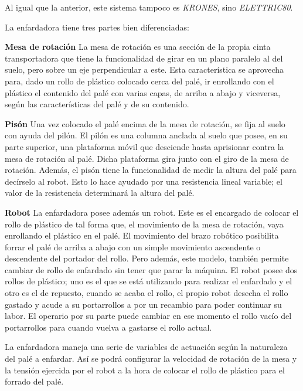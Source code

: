 \documentclass[11pt,a4paper,spanish,twoside]{report}
\begin{document}
Al igual que la anterior, este sistema tampoco es \emph{KRONES}, sino 
\emph{ELETTRIC80}.

La enfardadora tiene tres partes bien diferenciadas:
\begin{description}
\item \textbf{Mesa de rotación}
La mesa de rotación es una sección de la propia cinta transportadora que tiene 
la funcionalidad de girar en un plano paralelo al del suelo, pero sobre un eje 
perpendicular a este. Esta característica se aprovecha para, dado un rollo de 
plástico colocado cerca del palé, ir enrollando con el plástico el contenido 
del palé con varias capas, de arriba a abajo y viceversa, según las 
características del palé y de su contenido.
\item \textbf{Pisón}
Una vez colocado el palé encima de la mesa de rotación, se fija al suelo con 
ayuda del pilón. El pilón es una columna anclada al suelo que posee, en su 
parte superior, una plataforma móvil que desciende hasta aprisionar contra la
mesa de rotación al palé. Dicha plataforma gira junto con el giro de la mesa de
rotación. Además, el pisón tiene la funcionalidad de medir la altura del palé 
para decírselo al robot. Esto lo hace ayudado por una resistencia lineal
variable; el valor de la resistencia determinará la altura del palé.
\item \textbf{Robot}
La enfardadora posee además un robot. Este es el encargado de colocar el rollo 
de plástico de tal forma que, el movimiento de la mesa de rotación, vaya 
enrollando el plástico en el palé. El movimiento del brazo robótico posibilita 
forrar el palé de arriba a abajo con un simple movimiento ascendente o 
descendente del portador del rollo. Pero además, este modelo, también permite 
cambiar de rollo de enfardado sin tener que parar la máquina. El robot posee 
dos rollos de plástico; uno es el que se está utilizando para realizar el 
enfardado y el otro es el de repuesto, cuando se acaba el rollo, el propio 
robot desecha el rollo gastado y acude a su portarrollos a por un recambio para
poder continuar su labor. El operario por su parte puede cambiar en ese momento
el rollo vacío del portarrollos para cuando vuelva a gastarse el rollo actual.
\end{description}

La enfardadora maneja una serie de variables de actuación según la naturaleza
del palé a enfardar. Así se podrá configurar la velocidad de rotación de la 
mesa y la tensión ejercida por el robot a la hora de colocar el rollo de 
plástico para el forrado del palé.
\end{document}
